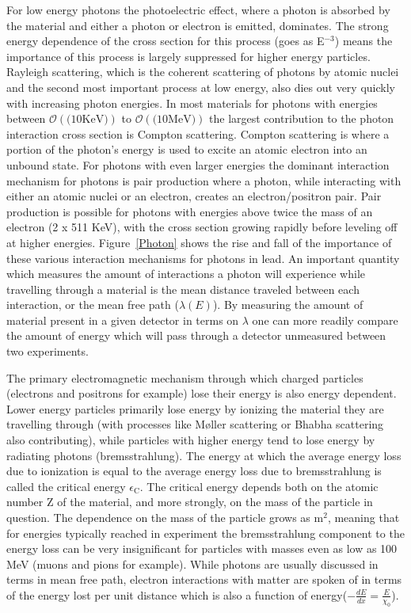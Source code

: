 For low energy photons the photoelectric effect, where a photon is absorbed by the material and either a photon or electron is emitted, dominates.  
The strong energy dependence of the cross section for this process (goes as E$^{-3}$) means the importance of this process is largely suppressed for higher energy particles.  
Rayleigh scattering, which is the coherent scattering of photons by atomic nuclei and the second most important process at low energy, also dies out very quickly with increasing photon energies.  
In most materials for photons with energies between $\mathcal{O}\left(\mathrm(10 \mathrm{KeV})\right)$ to $\mathcal{O}\left(\mathrm(10 \mathrm{MeV})\right)$ the largest contribution to the photon interaction cross section is Compton scattering.  
Compton scattering is where a portion of the photon's energy is used to excite an atomic electron into an unbound state.  
For photons with even larger energies the dominant interaction mechanism for photons is pair production where a photon, while interacting with either an atomic nuclei or an electron, creates an electron/positron pair.  
Pair production is possible for photons with energies above twice the mass of an electron (2 x 511 KeV), with the cross section growing rapidly before leveling off at higher energies.  
Figure~\ref{Photon} shows the rise and fall of the importance of these various interaction mechanisms for photons in lead.  
An important quantity which measures the amount of interactions a photon will experience while travelling through a material is the mean distance traveled between each interaction, or the mean free path ($\lambda\left(E\right)$).  
By measuring the amount of material present in a given detector in terms on $\lambda$ one can more readily compare the amount of energy which will pass through a detector unmeasured between two experiments.  


The primary electromagnetic mechanism through which charged particles (electrons and positrons for example) lose their energy is also energy dependent.  
Lower energy particles primarily lose energy by ionizing the material they are travelling through (with processes like M{\o}ller scattering or Bhabha scattering also contributing), while particles with higher energy tend to lose energy by radiating photons (bremsstrahlung).  
The energy at which the average energy loss due to ionization is equal to the average energy loss due to bremsstrahlung is called the critical energy $\epsilon_{\mathrm{C}}$.  
The critical energy depends both on the atomic number Z of the material, and more strongly, on the mass of the particle in question.  
The dependence on the mass of the particle grows as m$^2$, meaning that for energies typically reached in experiment the bremsstrahlung component to the energy loss can be very insignificant for particles with masses even as low as 100 MeV (muons and pions for example).  
While photons are usually discussed in terms in mean free path, electron interactions with matter are spoken of in terms of the energy lost per unit distance which is also a function of energy($-\frac{dE}{dx}=\frac{E}{\chi_{0}}$).  

